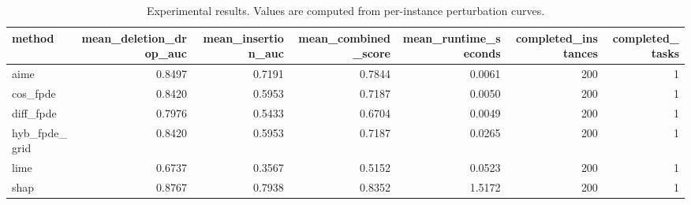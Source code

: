 \begin{table}[t]
\caption{Experimental results. Values are computed from per-instance perturbation curves.}
\label{tab:main_results_computed}
\centering
\begin{tabular}{lrrrrrr}
\toprule
method & mean\_deletion\_drop\_auc & mean\_insertion\_auc & mean\_combined\_score & mean\_runtime\_seconds & completed\_instances & completed\_tasks \\
\midrule
aime & 0.8497 & 0.7191 & 0.7844 & 0.0061 & 200 & 1 \\
cos\_fpde & 0.8420 & 0.5953 & 0.7187 & 0.0050 & 200 & 1 \\
diff\_fpde & 0.7976 & 0.5433 & 0.6704 & 0.0049 & 200 & 1 \\
hyb\_fpde\_grid & 0.8420 & 0.5953 & 0.7187 & 0.0265 & 200 & 1 \\
lime & 0.6737 & 0.3567 & 0.5152 & 0.0523 & 200 & 1 \\
shap & 0.8767 & 0.7938 & 0.8352 & 1.5172 & 200 & 1 \\
\bottomrule
\end{tabular}

\end{table}
